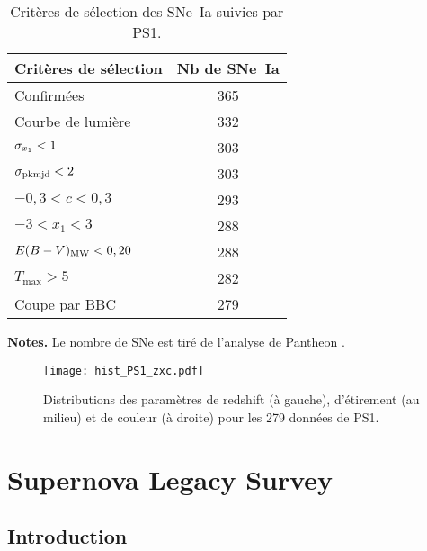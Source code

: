 \documentclass[../main/main.tex]{subfiles}
\begin{document}
\begin{table}[]
    \centering
    \begin{threeparttable}
        \caption{Critères de sélection des SNe~Ia suivies par PS1.}
        \label{tab:ps1cuts}
        \begin{tabular}{lc}
            \toprule
            Critères de sélection     & Nb de SNe~Ia \\
            \midrule
            Confirmées                & 365 \\
            Courbe de lumière         & 332 \\
            $\sigma_{x_1} < 1$            & 303 \\
            $\sigma_{\rm pkmjd} < 2$      & 303 \\
            $-0,3 < c < 0,3$          & 293 \\
            $-3 < x_1 < 3$            & 288 \\
            $E(B-V)_{\rm MW} < 0,20 $ & 288 \\
            $T_{\max} > 5$            & 282 \\
            \midrule
            Coupe par BBC             & 279 \\
            \bottomrule
        \end{tabular}
        \begin{tablenotes}[flushleft]
        \item \textbf{\hspace{-3,2pt}Notes.} Le nombre de SNe est tiré de
            l'analyse de Pantheon \citep{scolnic2018}.
        \end{tablenotes}
    \end{threeparttable}
\end{table}

\begin{figure}[ht]
    \centering
    \texttt{[image: hist\_PS1\_zxc.pdf]}
    \caption[Distributions des paramètres de redshift, étirement et couleur de
    PS1]{Distributions des paramètres de redshift (à gauche), d'étirement (au
    milieu) et de couleur (à droite) pour les 279 données de PS1.}
    \label{fig:ps1hist}
\end{figure}

\section{Supernova Legacy Survey}\label{sec:snls}
\subsection{Introduction}\label{ssec:snlsintro}
\end{document}
